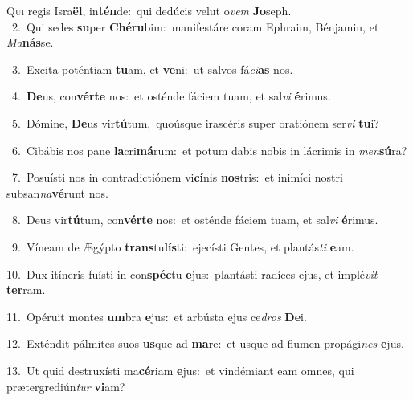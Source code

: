 \lettrine{\initial\textcolor{\initialcolor}{Q}}{ui} regis Isra\-\textbf{ël}\-, in\-\textbf{tén}\-de:~\star qui dedúcis velut o\textit{vem} \textbf{Jo}\-seph.\\
{\numbfont\textcolor{\numbcolor}{~2.}}~Qui sedes \textbf{su}\-per \textbf{Ché}\-\textbf{ru}bim:~\star manifestáre coram Ephraim, Bénjamin, et \textit{Ma}\-\textbf{nás}se.\par
{\numbfont\textcolor{\numbcolor}{~3.}}~Excita poténtiam \textbf{tu}\-am, et \textbf{ve}\-ni:~\star ut salvos fá\-\textit{ci}\-\textbf{as} nos.\par
{\numbfont\textcolor{\numbcolor}{~4.}}~\-\textbf{De}\-us, con\-\textbf{vér}\-\textbf{te} nos:~\star et osténde fáciem tuam, et sal\textit{vi} \textbf{é}\-rimus.\par
{\numbfont\textcolor{\numbcolor}{~5.}}~Dómine, \textbf{De}\-us vir\-\textbf{tú}\-tum,~\star quoúsque irascéris super oratiónem ser\textit{vi} \textbf{tu}\-i?\par
{\numbfont\textcolor{\numbcolor}{~6.}}~Cibábis nos pane \textbf{la}\-cri\-\textbf{má}\-rum:~\star et potum dabis nobis in lácrimis in \textit{men}\-\textbf{sú}ra?\par
{\numbfont\textcolor{\numbcolor}{~7.}}~Posuísti nos in contradictiónem vi\-\textbf{cí}\-nis \textbf{nos}\-tris:~\star et inimíci nostri subsan\-\textit{na}\-\textbf{vé}runt nos.\par
{\numbfont\textcolor{\numbcolor}{~8.}}~Deus vir\-\textbf{tú}\-tum, con\-\textbf{vér}\-\textbf{te} nos:~\star et osténde fáciem tuam, et sal\textit{vi} \textbf{é}\-rimus.\par
{\numbfont\textcolor{\numbcolor}{~9.}}~Víneam de Ægýpto \textbf{trans}\-tu\-\textbf{lís}\-ti:~\star ejecísti Gentes, et plantás\textit{ti} \textbf{e}\-am.\par
{\numbfont\textcolor{\numbcolor}{10.}}~Dux itíneris fuísti in con\-\textbf{spéc}\-tu \textbf{e}\-jus:~\star plantásti radíces ejus, et implé\textit{vit} \textbf{ter}\-ram.\par
{\numbfont\textcolor{\numbcolor}{11.}}~Opéruit montes \textbf{um}\-bra \textbf{e}\-jus:~\star et arbústa ejus ce\textit{dros} \textbf{De}\-i.\par
{\numbfont\textcolor{\numbcolor}{12.}}~Exténdit pálmites suos \textbf{us}\-que ad \textbf{ma}\-re:~\star et usque ad flumen propági\textit{nes} \textbf{e}\-jus.\par
{\numbfont\textcolor{\numbcolor}{13.}}~Ut quid destruxísti ma\-\textbf{cé}\-riam \textbf{e}\-jus:~\star et vindémiant eam omnes, qui prætergrediún\textit{tur} \textbf{vi}\-am?\par
